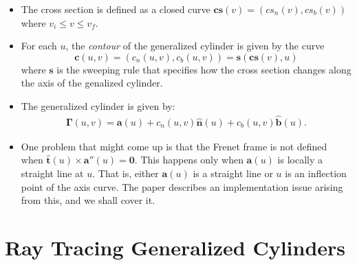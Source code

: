 \documentclass[10pt]{article}
\newcommand{\ve}[1]{\bm{#1}}
\begin{document}
\begin{itemize}
  \item The cross section is defined as a closed curve $\ve{cs}(v) = (cs_n(v), cs_b(v))$ where $v_i \leq v \leq v_f$.
  
  \item For each $u$, the \emph{contour} of the generalized cylinder is given by the curve $$\ve{c}(u,v) = (c_n(u,v), c_b(u,v)) = \ve{s}(\ve{cs}(v), u)$$ where $\ve{s}$ is the sweeping rule that specifies how the cross section changes along the axis of the genalized cylinder.
  
  \item The generalized cylinder is given by:
  \begin{align*}
    \ve{\Gamma}(u,v) = \ve{a}(u) + c_n(u,v)\hat{\ve{n}}(u) + c_b(u,v)\hat{\ve{b}}(u).
  \end{align*}
  
  \item One problem that might come up is that the Frenet frame is not defined when $\hat{\ve{t}}(u) \times \ve{a}''(u) = \ve{0}.$ This happens only when $\ve{a}(u)$ is locally a straight line at $u$. That is, either $\ve{a}(u)$ is a straight line or $u$ is an inflection point of the axis curve. The paper describes an implementation issue arising from this, and we shall cover it.
  
\end{itemize}


\section{Ray Tracing Generalized Cylinders}\label{sec:ray_tracing_generalized_cylinders} %
\end{document}
